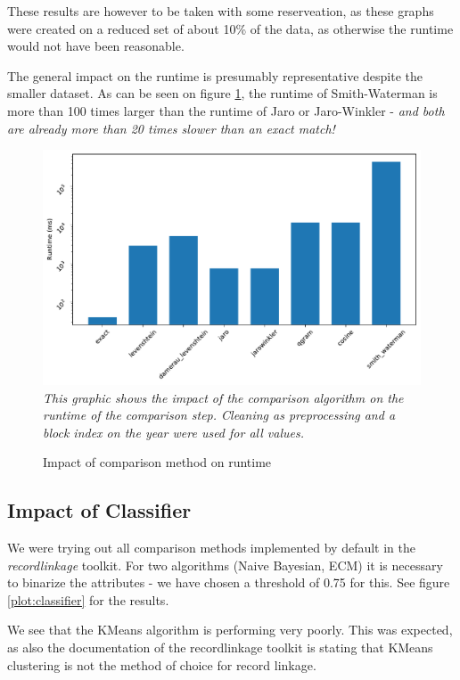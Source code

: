\documentclass[sigconf,nonacm]{acmart}
\begin{document}
These results are however to be taken with some reserveation, as these
graphs were created on a reduced set of about 10\% of the data, as otherwise
the runtime would not have been reasonable.

The general impact on the runtime is presumably representative despite the
smaller dataset.
As can be seen on figure \ref{plot:comparison2}, the runtime of Smith-Waterman
is more than 100 times larger than the runtime of Jaro or Jaro-Winkler
- \emph{and both are already more than 20 times slower than an exact match!}

\begin{figure}[h]
\centering
\caption{Impact of comparison method on runtime}
\label{plot:comparison2}
\includegraphics[width=0.9\linewidth]{../figures/debug_eval_comparison2}\\[-2mm]
\emph{\small
This graphic shows the impact of the comparison algorithm on the
runtime of the comparison step.
Cleaning as preprocessing and a block index on the year were used for all values.}
\end{figure}

\subsection{Impact of Classifier}

We were trying out all comparison methods implemented by default in the
\emph{recordlinkage} toolkit.
For two algorithms (Naive Bayesian, ECM) it is necessary to binarize
the attributes - we have chosen a threshold of 0.75 for this.
See figure \ref{plot:classifier} for the results.

We see that the KMeans algorithm is performing very poorly.
This was expected, as also the documentation of the recordlinkage toolkit
is stating that KMeans clustering is not the method of choice for record
linkage.
\end{document}

